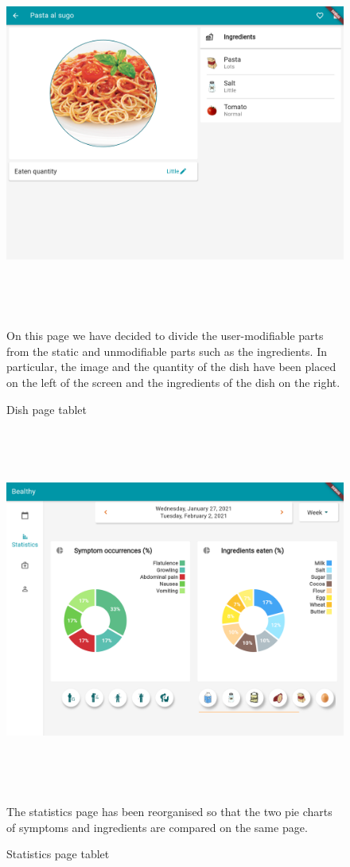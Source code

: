 \documentclass [12pt]{article}
\begin{document}
\begin{figure}[h!]
\centering
\includegraphics[width=\linewidth,height=12cm]{dishPageHorizontal.png}
\caption{Dish page tablet}
\medskip
\small
On this page we have decided to divide the user-modifiable parts from the static and unmodifiable parts such as the ingredients.
In particular, the image and the quantity of the dish have been placed on the left of the screen and the ingredients of the dish on the right.
\end{figure}
\begin{figure}[h!]
\centering
\includegraphics[width=\linewidth,height=12cm]{statisticsHorizontal.png}
\caption{Statistics page tablet}
\medskip
\small
The statistics page has been reorganised so that the two pie charts of symptoms and ingredients are compared on the same page. 
\end{figure}
\end{document}
